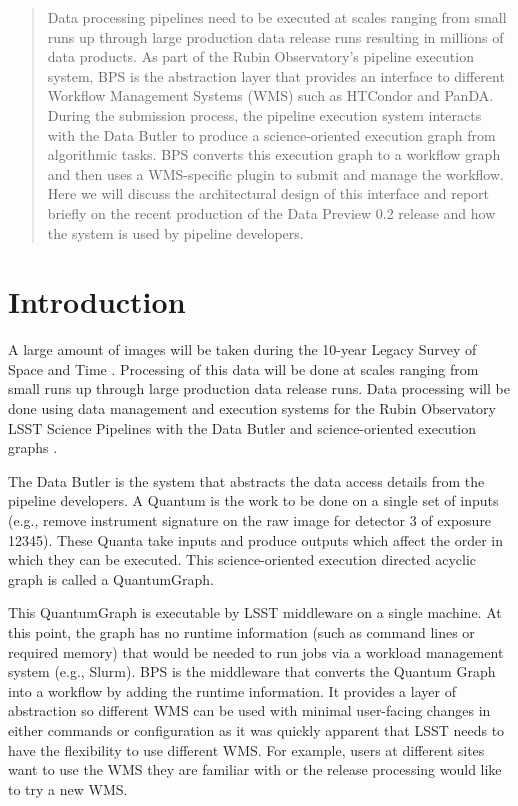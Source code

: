 \documentclass[11pt,twoside]{article}
\begin{document}
\begin{abstract}

Data processing pipelines need to be executed at scales ranging from
small runs up through large production data release runs resulting in
millions of data products.  As part of the Rubin Observatory's pipeline
execution system, BPS is the abstraction layer that provides an interface
to different Workflow Management Systems (WMS) such as HTCondor and PanDA.
During the submission process, the pipeline execution system interacts
with the Data Butler to produce a science-oriented execution graph from
algorithmic tasks.  BPS converts this execution graph to a workflow graph
and then uses a WMS-specific plugin to submit and manage the workflow.
Here we will discuss the architectural design of this interface and
report briefly on the recent production of the Data Preview 0.2 release
and how the system is used by pipeline developers.

\end{abstract}

\section{Introduction}

A large amount of images will be taken during the 10-year Legacy Survey
of Space and Time \citep[LSST;][]{2019ApJ...873..111I, I08_adassxxxii}.  Processing of this
data will be done at scales ranging from small runs up through large
production data release runs.
Data processing will be done using data management and execution systems
for the Rubin Observatory LSST Science Pipelines with the Data Butler and science-oriented execution graphs \citep{C24_adassxxxii,2022SPIE12189E..11J}.

The Data Butler is the system that abstracts the data access details from
the pipeline developers.  A Quantum is the work to be done on a single set
of inputs (e.g., remove instrument signature on the raw image for detector
3 of exposure 12345). These Quanta take inputs and produce outputs which
affect the order in which they can be executed.  This science-oriented
execution directed acyclic graph is called a QuantumGraph.

This QuantumGraph is executable by LSST middleware on a single machine.
At this point, the graph has no runtime information (such as command
lines or required memory) that would be needed to run jobs via
a workload management system (e.g., Slurm).  BPS is the middleware
that converts the Quantum Graph into a workflow by adding the runtime
information. It provides a layer of abstraction so different WMS can be
used with minimal user-facing changes in either commands or configuration
as it was quickly apparent that LSST needs to have the flexibility to
use different WMS. For example, users at different sites want to use
the WMS they are familiar with or the release processing would like to
try a new WMS.
\end{document}
